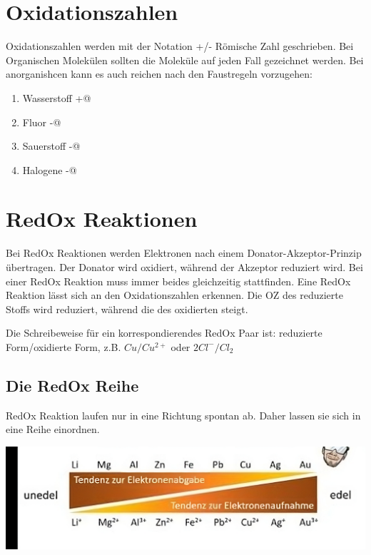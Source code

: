 \documentclass{article}
\makeatletter
\newcommand{\Rmnum}[1]{\expandafter\@slowromancap\romannumeral #1@}
\makeatother
\begin{document}
\section*{Oxidationszahlen}
Oxidationszahlen werden mit der Notation +/- Römische Zahl geschrieben.
Bei Organischen Molekülen sollten die Moleküle auf jeden Fall gezeichnet werden.
Bei anorganishcen kann es auch reichen nach den Faustregeln vorzugehen:
\begin{enumerate}
    \item Wasserstoff +\Rmnum{1}
    \item Fluor -\Rmnum{1}
    \item Sauerstoff -\Rmnum{2}
    \item Halogene -\Rmnum{1}
\end{enumerate}

\section*{RedOx Reaktionen}
Bei RedOx Reaktionen werden Elektronen nach einem Donator-Akzeptor-Prinzip übertragen.
Der Donator wird oxidiert, während der Akzeptor reduziert wird. Bei einer RedOx Reaktion
muss immer beides gleichzeitig stattfinden. Eine RedOx Reaktion lässt sich an den Oxidationszahlen
erkennen. Die OZ des reduzierte Stoffs wird reduziert, während die des oxidierten steigt.

Die Schreibeweise für ein korrespondierendes RedOx Paar ist: reduzierte Form/oxidierte Form, z.B. $Cu/Cu^{2+}$
oder $2 Cl^-/Cl_2$

\subsection*{Die RedOx Reihe}
RedOx Reaktion laufen nur in eine Richtung spontan ab. Daher lassen sie sich in eine Reihe einordnen.

\includegraphics*[width=\textwidth]{img/Redoxreihe}
\end{document}
